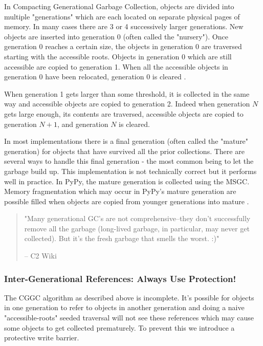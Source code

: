 \documentclass{article}
\begin{document}
  In Compacting Generational Garbage Collection, objects are divided into multiple "generations" which are each located on separate physical pages of memory.  In many cases there are 3 or 4 successively larger generations.  New objects are inserted into generation 0 (often called the "nursery").  Once generation 0 reaches a certain size, the objects in generation 0 are traversed starting with the accessible roots.  Objects in generation 0 which are still accessible are copied to generation 1.  When all the accessible objects in generation 0 have been relocated, generation 0 is cleared \cite{GC-continuum}.  

  When generation 1 gets larger than some threshold, it is collected in the same way and accessible objects are copied to generation 2.  Indeed when generation $N$ gets large enough, its contents are traversed, accessible objects are copied to generation $N+1$, and generation $N$ is cleared.

  In most implementations there is a final generation (often called the "mature" generation) for objects that have survived all the prior collections.  There are several ways to handle this final generation - the most common being to let the garbage build up.  This implementation is not technically correct but it performs well in practice.  In PyPy, the mature generation is collected using the MSGC.  Memory fragmentation which may occur in PyPy's mature generation are possible filled when objects are copied from younger generations into mature \cite{pypy-doc}.  

  \begin{quotation}
	"Many generational GC's are not comprehensive--they don't successfully remove all the garbage (long-lived garbage, in particular, may never get collected). But it's the fresh garbage that smells the worst. :)"

	-- C2 Wiki\cite{C2}
  \end{quotation}

  \subsubsection{Inter-Generational References: Always Use Protection!}

  The CGGC algorithm as described above is incomplete.  It's possible for objects in one generation to refer to objects in another generation and doing a naive "accessible-roots" seeded traversal will not see these references which may cause some objects to get collected prematurely.  To prevent this we introduce a protective write barrier.  
\end{document}

